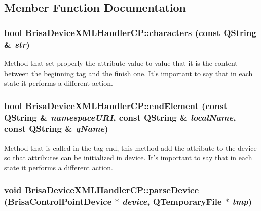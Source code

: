 \subsection{Member Function Documentation}
\hypertarget{classBrisaUpnp_1_1BrisaDeviceXMLHandlerCP_a2454d1df1b1f929bbdce76a5ece2b696}{
\subsubsection[{characters}]{\setlength{\rightskip}{0pt plus 5cm}bool BrisaDeviceXMLHandlerCP::characters (const QString \& {\em str})}}
\label{classBrisaUpnp_1_1BrisaDeviceXMLHandlerCP_a2454d1df1b1f929bbdce76a5ece2b696}


Method that set properly the attribute value to  value that it is the content between the beginning tag and the finish one. It's important to say that in each state it performs a different action. \hypertarget{classBrisaUpnp_1_1BrisaDeviceXMLHandlerCP_a9dfef9aec628dea7aed0fa9307579d98}{
\subsubsection[{endElement}]{\setlength{\rightskip}{0pt plus 5cm}bool BrisaDeviceXMLHandlerCP::endElement (const QString \& {\em namespaceURI}, \/  const QString \& {\em localName}, \/  const QString \& {\em qName})}}
\label{classBrisaUpnp_1_1BrisaDeviceXMLHandlerCP_a9dfef9aec628dea7aed0fa9307579d98}


Method that is called in the tag end, this method add the attribute to the device so that attributes can be initialized in device. It's important to say that in each state it performs a different action. \hypertarget{classBrisaUpnp_1_1BrisaDeviceXMLHandlerCP_a1d6d0b57a31c77b174c08e8ddaedea04}{
\subsubsection[{parseDevice}]{\setlength{\rightskip}{0pt plus 5cm}void BrisaDeviceXMLHandlerCP::parseDevice ({\bf BrisaControlPointDevice} $\ast$ {\em device}, \/  QTemporaryFile $\ast$ {\em tmp})}}
\label{classBrisaUpnp_1_1BrisaDeviceXMLHandlerCP_a1d6d0b57a31c77b174c08e8ddaedea04}


